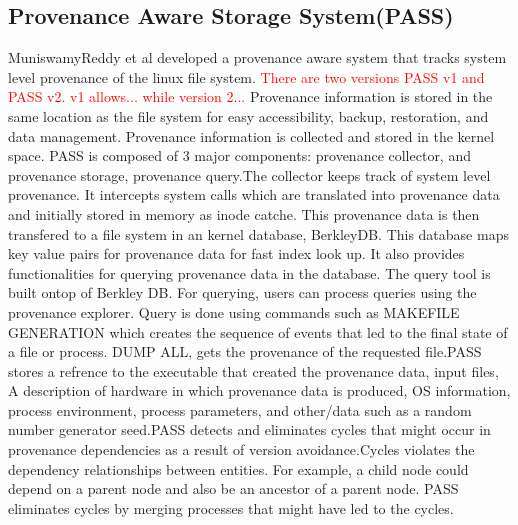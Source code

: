 \subsection{Provenance Aware Storage System(PASS)}
MuniswamyReddy
et al developed a provenance aware system that tracks  system level provenance of the linux file system.\textcolor{red}{ There are two versions PASS v1 and PASS v2. v1 allows... while version 2...} Provenance information
is stored in the same location as the file system for easy accessibility, backup,
restoration, and data management. Provenance information is collected and stored in
the kernel space. PASS is composed of 3 major components: provenance collector, and provenance storage, provenance query.The collector keeps track of system level provenance. It intercepts system calls which are translated into provenance data and initially stored in memory as inode catche. This provenance data is then transfered to a file system in an kernel database, BerkleyDB. This database maps key value pairs for provenance data for fast index look up. It also provides functionalities for querying provenance data in the database. The query tool is built ontop of Berkley DB. For querying, users can process queries using the provenance explorer. Query is done using commands such as MAKEFILE  GENERATION which creates the sequence of events that led to the final state of a file or process. DUMP ALL, gets the provenance of the requested file.PASS stores a refrence to the executable that created the provenance data, input files, A description of hardware in which provenance data is produced, OS information, process environment, process parameters, and other/data such as a random number generator seed.PASS detects and eliminates cycles that might occur in provenance dependencies as a result of version avoidance.Cycles violates the dependency relationships between entities. For example, a child node could depend on a parent node and also be an ancestor of a parent node. PASS eliminates cycles by merging processes that might have led to the cycles. 

